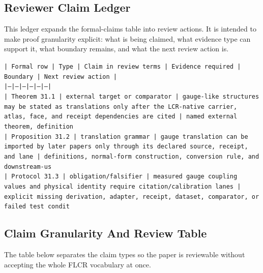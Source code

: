 \documentclass[11pt]{article}
\begin{document}
\subsection*{Reviewer Claim Ledger}

This ledger expands the formal-claims table into review actions. It is intended to make proof granularity explicit: what is being claimed, what evidence type can support it, what boundary remains, and what the next review action is.

\noindent\texttt{| Formal row | Type | Claim in review terms | Evidence required | Boundary | Next review action |}\\
\noindent\texttt{|---|---|---|---|---|---|}\\
\noindent\texttt{| Theorem 31.1 | external target or comparator | gauge-like structures may be stated as translations only after the LCR-native carrier, atlas, face, and receipt dependencies are cited | named external theorem, definition}\\
\noindent\texttt{| Proposition 31.2 | translation grammar | gauge translation can be imported by later papers only through its declared source, receipt, and lane | definitions, normal-form construction, conversion rule, and downstream-us}\\
\noindent\texttt{| Protocol 31.3 | obligation/falsifier | measured gauge coupling values and physical identity require citation/calibration lanes | explicit missing derivation, adapter, receipt, dataset, comparator, or failed test condit}\\

\subsection*{Claim Granularity And Review Table}

The table below separates the claim types so the paper is reviewable without accepting the whole FLCR vocabulary at once.
\end{document}
